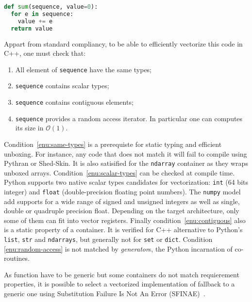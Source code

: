 \documentclass[preprint]{sigplanconf}
\begin{document}
\begin{lstlisting}[language=python, label={lst:sum-py}, caption={Pseudo code of the \texttt{sum} intrinsic.}]
def sum(sequence, value=0):
  for e in sequence:
    value += e
  return value
\end{lstlisting}


Appart from standard compliancy, to be able to efficiently vectorize this code in C++, one must check that:

\begin{enumerate}
    \item\label{enu:same-types} All element of \texttt{sequence} have the same types;
    \item\label{enu:scalar-types} \texttt{sequence} contains scalar types;
    \item\label{enu:contiguous} \texttt{sequence} contains contiguous elements;
    \item\label{enu:random-access} \texttt{sequence} provides a random access iterator. In particular one can computes its size in $\mathcal{O}(1)$.
\end{enumerate}

Condition~\ref{enu:same-types} is a prerequiste for static typing and efficient
unboxing. For instance, any code that does not match it will fail to compile
using Pythran or Shed-Skin. It is also satisified for the \texttt{ndarray}
container as they wraps unboxed arrays. Condition~\ref{enu:scalar-types} can be
checked at compile time. Python supports two native scalar types candidates for
vectorization: \texttt{int} (64 bits integer) and \texttt{float}
(double-precision floating point numbers). The \texttt{numpy} model add supports for a
wide range of signed and unsigned integers as well as single, double or
quadruple precision float. Depending on the target architecture, only some of
them can fit into vector registers. Finally condition~\ref{enu:contiguous} also
is a static property of a container. It is verified for C++ alternative to
Python's \texttt{list}, \texttt{str} and \texttt{ndarrays}, but generally not
for \texttt{set} or \texttt{dict}. Condition \ref{enu:random-access} is not
matched by \emph{generator}s, the Python incarnation of co-routines.


As function have to be generic but some containers do not match requierement
properties, it is possible to select a vectorized
implementation of fallback to a generic one using Substitution Failure
Is Not An Error (SFINAE)~\cite{metaprogramming2002}.
\end{document}
